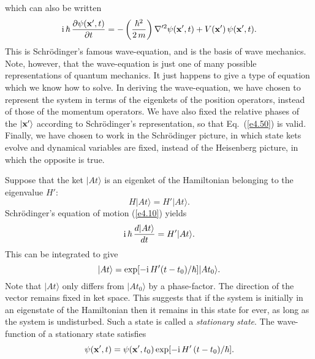 which can also be written
\begin{equation}\label{e4.54}
{\rm i}\,\hbar\,\frac{\partial \psi({\bf x}', t)}{\partial t}
= -  \left(\frac{\hbar^2}{2\,m}\right)
\nabla'^2\psi({\bf x}', t) + V({\bf x'})\, \psi({\bf x'}, t).
\end{equation}
This is Schr\"{o}dinger's famous wave-equation, and is the basis of
wave mechanics. Note, however, that the wave-equation is 
just one of many possible representations of quantum mechanics. It just happens
to give a type of equation which we know how to solve. In deriving the wave-equation, we have chosen to represent the system in terms of the eigenkets of
the position operators, instead of those of the momentum operators. We have
also fixed the relative phases of the $|{\bf x'}\rangle$ according to 
Schr\"{o}dinger's representation, so that Eq.~(\ref{e4.50}) is valid.  Finally, we
have chosen to work in the Schr\"{o}dinger picture, in which state kets evolve
and dynamical variables are fixed, instead of the Heisenberg picture,
in which the opposite is true. 

Suppose that the ket $|At\rangle$ is an eigenket of the Hamiltonian
belonging to the eigenvalue $H'$:
\begin{equation}
H|At\rangle = H'|At\rangle.
\end{equation}
Schr\"{o}dinger's equation of motion (\ref{e4.10}) yields
\begin{equation}
{\rm i}\,\hbar \,\frac{d |At\rangle}{dt} = H' |At\rangle.
\end{equation}
This can be integrated to give
\begin{equation}
|At\rangle = \exp[ -{\rm i}\,H'(t-t_0)/\hbar] |At_0\rangle.
\end{equation}
Note that $|At\rangle$ only differs from $|At_0\rangle$ by a phase-factor. The direction of the vector remains fixed in ket space. This
suggests that if the system is initially in an eigenstate of the
Hamiltonian then it remains in this state for ever, as long as the system
is undisturbed. Such a state is called a {\em stationary state}. The wave-function
of a stationary state satisfies 
\begin{equation}
\psi({\bf x}', t) = \psi({\bf x'}, t_0) \exp[ -{\rm i}\,H'\,(t-t_0)/\hbar].
\end{equation}

